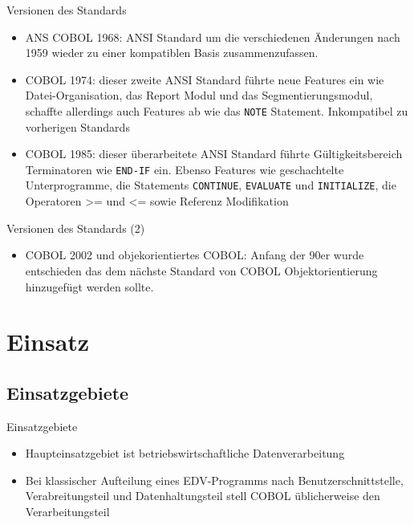 \documentclass{beamer}
\begin{document}
\begin{frame}{Versionen des Standards}
	\begin{itemize}
		\item
			ANS COBOL 1968: ANSI Standard um die verschiedenen \"Anderungen nach 1959 wieder zu einer kompatiblen Basis zusammenzufassen.
		\item
			COBOL 1974: dieser zweite ANSI Standard f\"uhrte neue Features ein wie Datei-Organisation, das Report Modul und das Segmentierungsmodul, schaffte allerdings auch Features ab wie das \texttt{NOTE} Statement. Inkompatibel zu vorherigen Standards
		\item
			COBOL 1985: dieser \"uberarbeitete ANSI Standard f\"uhrte G\"ultigkeitsbereich Terminatoren wie \texttt{END-IF} ein. Ebenso Features wie geschachtelte Unterprogramme, die Statements \texttt{CONTINUE}, \texttt{EVALUATE} und \texttt{INITIALIZE}, die Operatoren >= und <= sowie Referenz Modifikation
	\end{itemize}
\end{frame}

\begin{frame}{Versionen des Standards (2)}
		\begin{itemize}
			\item
				COBOL 2002 und objekorientiertes COBOL: Anfang der 90er wurde entschieden das dem n\"achste Standard von COBOL Objektorientierung hinzugef\"ugt werden sollte.
		\end{itemize}
\end{frame}

\section{Einsatz}

\subsection{Einsatzgebiete}

\begin{frame}{Einsatzgebiete}
	\begin{itemize}
		\item
			Haupteinsatzgebiet ist betriebswirtschaftliche Datenverarbeitung
		\item
			Bei klassischer Aufteilung eines EDV-Programms nach Benutzerschnittstelle, Verabreitungsteil und Datenhaltungsteil stell COBOL \"ublicherweise den Verarbeitungsteil
	\end{itemize}
\end{frame}
\end{document}
